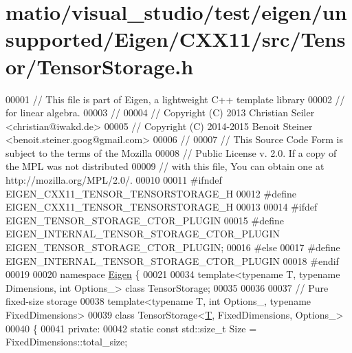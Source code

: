 \hypertarget{matio_2visual__studio_2test_2eigen_2unsupported_2_eigen_2_c_x_x11_2src_2_tensor_2_tensor_storage_8h_source}{}\section{matio/visual\+\_\+studio/test/eigen/unsupported/\+Eigen/\+C\+X\+X11/src/\+Tensor/\+Tensor\+Storage.h}
\label{matio_2visual__studio_2test_2eigen_2unsupported_2_eigen_2_c_x_x11_2src_2_tensor_2_tensor_storage_8h_source}

\begin{DoxyCode}
00001 \textcolor{comment}{// This file is part of Eigen, a lightweight C++ template library}
00002 \textcolor{comment}{// for linear algebra.}
00003 \textcolor{comment}{//}
00004 \textcolor{comment}{// Copyright (C) 2013 Christian Seiler <christian@iwakd.de>}
00005 \textcolor{comment}{// Copyright (C) 2014-2015 Benoit Steiner <benoit.steiner.goog@gmail.com>}
00006 \textcolor{comment}{//}
00007 \textcolor{comment}{// This Source Code Form is subject to the terms of the Mozilla}
00008 \textcolor{comment}{// Public License v. 2.0. If a copy of the MPL was not distributed}
00009 \textcolor{comment}{// with this file, You can obtain one at http://mozilla.org/MPL/2.0/.}
00010 
00011 \textcolor{preprocessor}{#ifndef EIGEN\_CXX11\_TENSOR\_TENSORSTORAGE\_H}
00012 \textcolor{preprocessor}{#define EIGEN\_CXX11\_TENSOR\_TENSORSTORAGE\_H}
00013 
00014 \textcolor{preprocessor}{#ifdef EIGEN\_TENSOR\_STORAGE\_CTOR\_PLUGIN}
00015 \textcolor{preprocessor}{  #define EIGEN\_INTERNAL\_TENSOR\_STORAGE\_CTOR\_PLUGIN EIGEN\_TENSOR\_STORAGE\_CTOR\_PLUGIN;}
00016 \textcolor{preprocessor}{#else}
00017 \textcolor{preprocessor}{  #define EIGEN\_INTERNAL\_TENSOR\_STORAGE\_CTOR\_PLUGIN}
00018 \textcolor{preprocessor}{#endif}
00019 
00020 \textcolor{keyword}{namespace }\hyperlink{namespace_eigen}{Eigen} \{
00021 
00034 \textcolor{keyword}{template}<\textcolor{keyword}{typename} T, \textcolor{keyword}{typename} Dimensions, \textcolor{keywordtype}{int} Options\_> \textcolor{keyword}{class }TensorStorage;
00035 
00036 
00037 \textcolor{comment}{// Pure fixed-size storage}
00038 \textcolor{keyword}{template}<\textcolor{keyword}{typename} T, \textcolor{keywordtype}{int} Options\_, \textcolor{keyword}{typename} FixedDimensions>
00039 \textcolor{keyword}{class }TensorStorage<\hyperlink{group___sparse_core___module_class_eigen_1_1_triplet}{T}, FixedDimensions, Options\_>
00040 \{
00041  \textcolor{keyword}{private}:
00042   \textcolor{keyword}{static} \textcolor{keyword}{const} std::size\_t Size = FixedDimensions::total\_size;

\end{DoxyCode}

